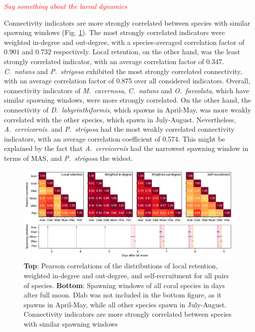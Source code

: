\documentclass[preprint,12pt,authoryear]{elsarticle}
\newcommand{\emphc}[1]{\emph{\textcolor{red}{#1}}}
\begin{document}
\emphc{Say something about the larval dynamics}

Connectivity indicators are more strongly correlated between species with similar spawning windows (Fig. \ref{fig:correlation}). The most strongly correlated indicators were weighted in-degree and out-degree, with a species-averaged correlation factor of $0.901$ and $0.732$ respectively. Local retention, on the other hand, was the least strongly correlated indicator, with an average correlation factor of 0.347. \textit{C.~natans} and \textit{P.~strigosa} exhibited the most strongly correlated connectivity, with an average correlation factor of 0.875 over all considered indicators. Overall, connectivity indicators of \textit{M.~cavernosa}, \textit{C.~natans} and \textit{O.~faveolata}, which have similar spawning windows, were more strongly correlated. On the other hand, the connectivity of \textit{D.~labyrinthiformis}, which spawns in April-May, was more weakly correlated with the other species, which spawn in July-August. Nevertheless, \textit{A.~cervicornis}. and \textit{P.~strigosa} had the most weakly correlated connectivity indicators, with an average correlation coefficient of 0.574. This might be explained by the fact that \textit{A.~cervicornis} had the narrowest spawning window in terms of MAS, and \textit{P.~strigosa} the widest.

\begin{figure}
    \centering
    \includegraphics[width=\textwidth]{figures/fig_correlation.png}
    \caption{\textbf{Top}: Pearson correlations of the distributions of local retention, weighted in-degree and out-degree, and self-recruitment for all pairs of species. \textbf{Bottom}: Spawning windows of all coral species in days after full moon. Dlab was not included in the bottom figure, as it spawns in April-May, while all other species spawn in July-August. Connectivity indicators are more strongly correlated between species with similar spawning windows}\label{fig:correlation}
\end{figure}
\end{document}
